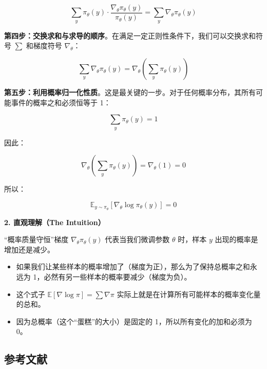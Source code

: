 \[
\sum_y \pi_\theta(y)\cdot
\frac{\nabla_\theta\pi_\theta(y)}{\pi_\theta(y)}
=\sum_y \nabla_\theta\pi_\theta(y)
\]

\textbf{第四步：交换求和与求导的顺序}。在满足一定正则性条件下，我们可以交换求和符号 \(\sum\) 和梯度符号 \(\nabla_\theta\)：

\[
\sum_y \nabla_\theta\pi_\theta(y)
=\nabla_\theta\left(\sum_y \pi_\theta(y)\right)
\]

\textbf{第五步：利用概率归一化性质}。这是最关键的一步。对于任何概率分布，其所有可能事件的概率之和必须恒等于 1：

\[
\sum_y \pi_\theta(y)=1
\]

因此：

\[
\nabla_\theta\left(\sum_y \pi_\theta(y)\right)
=\nabla_\theta(1)=0
\]

所以：

\[
\mathbb{E}_{y\sim\pi_\theta}\left[\nabla_\theta\log\pi_\theta(y)\right]=0
\]

\textbf{2. 直观理解（The Intuition）}

``概率质量守恒''梯度 \(\nabla_\theta\pi_\theta(y)\) 代表当我们微调参数 \(\theta\) 时，样本 \(y\) 出现的概率是增加还是减少。

\begin{itemize}
\tightlist
\item
  如果我们让某些样本的概率增加了（梯度为正），那么为了保持总概率之和永远为 1，必然有另一些样本的概率要减少（梯度为负）。
\item
  这个式子 \(\mathbb{E}[\nabla\log\pi]=\sum\nabla\pi\) 实际上就是在计算所有可能样本的概率变化量的总和。
\item
  因为总概率（这个``蛋糕''的大小）是固定的 1，所以所有变化的加和必须为 0。
\end{itemize}

\FloatBarrier
{}
\hypertarget{ux53c2ux8003ux6587ux732e-86}{%
\subsection{参考文献}\label{ux53c2ux8003ux6587ux732e-86}}


